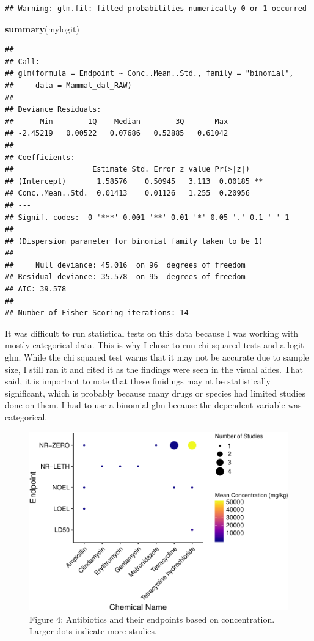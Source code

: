 \documentclass[12pt,]{article}
\newenvironment{Shaded}{\begin{snugshade}}{\end{snugshade}}
\newcommand{\KeywordTok}[1]{\textcolor[rgb]{0.13,0.29,0.53}{\textbf{#1}}}
\newcommand{\NormalTok}[1]{#1}
\begin{document}
\begin{verbatim}
## Warning: glm.fit: fitted probabilities numerically 0 or 1 occurred
\end{verbatim}

\begin{Shaded}
\begin{Highlighting}[]
\KeywordTok{summary}\NormalTok{(mylogit)}
\end{Highlighting}
\end{Shaded}

\begin{verbatim}
## 
## Call:
## glm(formula = Endpoint ~ Conc..Mean..Std., family = "binomial", 
##     data = Mammal_dat_RAW)
## 
## Deviance Residuals: 
##      Min        1Q    Median        3Q       Max  
## -2.45219   0.00522   0.07686   0.52885   0.61042  
## 
## Coefficients:
##                  Estimate Std. Error z value Pr(>|z|)   
## (Intercept)       1.58576    0.50945   3.113  0.00185 **
## Conc..Mean..Std.  0.01413    0.01126   1.255  0.20956   
## ---
## Signif. codes:  0 '***' 0.001 '**' 0.01 '*' 0.05 '.' 0.1 ' ' 1
## 
## (Dispersion parameter for binomial family taken to be 1)
## 
##     Null deviance: 45.016  on 96  degrees of freedom
## Residual deviance: 35.578  on 95  degrees of freedom
## AIC: 39.578
## 
## Number of Fisher Scoring iterations: 14
\end{verbatim}

It was difficult to run statistical tests on this data because I was
working with mostly categorical data. This is why I chose to run chi
squared tests and a logit glm. While the chi squared test warns that it
may not be accurate due to sample size, I still ran it and cited it as
the findings were seen in the visual aides. That said, it is important
to note that these finidings may nt be statistically significant, which
is probably because many drugs or species had limited studies done on
them. I had to use a binomial glm because the dependent variable was
categorical.

\begin{figure}
\centering
\includegraphics{Reents_ENV872L_Project_files/figure-latex/visualization 1-1.pdf}
\caption{Figure 4: Antibiotics and their endpoints based on
concentration. Larger dots indicate more studies.}
\end{figure}
\end{document}
